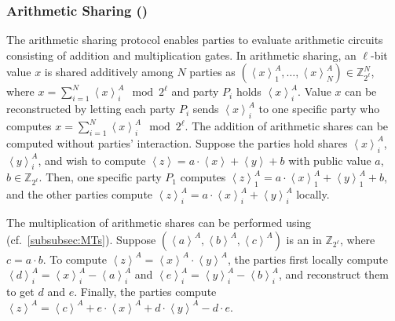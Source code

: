 \subsubsection{Arithmetic Sharing (\ARITH)}
\label{subsubsec:ArithmeticSharing}
The arithmetic sharing protocol enables parties to evaluate arithmetic circuits consisting of addition and multiplication gates.
In arithmetic sharing, an $\ell$-bit value $x$ is shared additively among $N$ parties as $\left(\left\langle x\right\rangle ^A_1, \ldots,\left\langle x\right\rangle ^A_N \right) \in \mathbb{Z} ^N_{2^{\ell}}$, where $x=\sum_{i=1}^{N} \left\langle x\right\rangle^A_i \mod{2^{\ell}} $ and party $P_i$ holds $\left\langle x\right\rangle^A_i $. Value $x$ can be reconstructed by letting each party $P_i$ sends $\left\langle x\right\rangle^A_i $ to one specific party who computes $x=\sum_{i=1}^{N} \left\langle x\right\rangle^A_i \mod{2^{\ell}}$.
The addition of arithmetic shares can be computed without parties' interaction. Suppose the parties hold shares $\left\langle x\right\rangle^A_i $, $\left\langle y\right\rangle^A_i $, and wish to compute $\left\langle z\right\rangle =a \cdot \left\langle x\right\rangle +\left\langle y\right\rangle +b$ with public value $a$, $b\in \mathbb{Z} _{2^{\ell}}$. Then, one specific party $P_1$ computes $\left\langle z\right\rangle ^A_1=a \cdot \left\langle x\right\rangle^A_1 +\left\langle y\right\rangle^A_1 +b$, and the other parties compute $ \left\langle z\right\rangle ^A_i=a \cdot \left\langle x\right\rangle^A_i +\left\langle y\right\rangle^A_i $ locally.

The multiplication of arithmetic shares can be performed using \mts (cf.~\autoref{subsubsec:MTs}). Suppose $\left(\left\langle a\right\rangle^A ,\left\langle b\right\rangle^A,\left\langle c\right\rangle^A\right) $ is an \mts in $\mathbb{Z} _{2^{\ell}}$, where $c =a \cdot b $. To compute $\left\langle z\right\rangle ^A = \left\langle x\right\rangle ^A \cdot \left\langle y\right\rangle ^A$, the parties first locally compute $\left\langle d\right\rangle ^A_i=\left\langle x\right\rangle ^A_i-\left\langle a\right\rangle^A_i $ and $\left\langle e\right\rangle ^A_i=\left\langle y\right\rangle ^A_i-\left\langle b\right\rangle ^A_i$, and reconstruct them to get $d$ and $e$. Finally, the parties compute $\left\langle z\right\rangle ^A = \left\langle c\right\rangle ^A+e \cdot \left\langle x\right\rangle ^A+d \cdot \left\langle y\right\rangle ^A- d \cdot e$.


